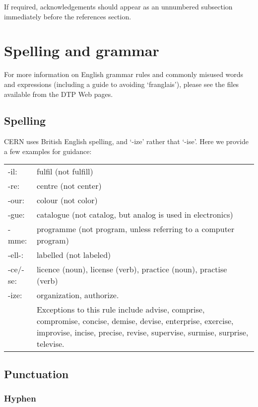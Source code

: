 \documentclass{cernyrep}
\begin{document}
If required, acknowledgements should appear as an unnumbered
subsection immediately before the references section.

\section{Spelling and grammar}

For more information on English grammar rules and commonly misused
words and expressions (including a guide to avoiding `franglais'),
please see the files available from the DTP Web pages.

\subsection{Spelling}

CERN uses British English spelling, and `-ize' rather that
`-ise'. Here we provide a few examples for guidance:
\begin{flushleft}
\begin{tabularx}{\linewidth}{@{}lX}
-il:     & fulfil (not fulfill) \\
-re:     & centre (not center) \\
-our:    & colour (not color) \\ 
-gue:    & catalogue (not catalog, but analog is used in electronics) \\ 
-mme:    & programme (not program, unless referring to a computer
           program) \\ 
-ell-:   & labelled (not labeled) \\ 
-ce/-se: & licence (noun), license (verb), practice (noun), practise (verb) \\ 
-ize:    & organization, authorize. \\
         & Exceptions to this rule include advise, comprise, compromise, 
           concise, demise, devise, enterprise, exercise, improvise, 
           incise, precise, revise, supervise, surmise, surprise, televise.\\
\end{tabularx}
\end{flushleft}

\subsection{Punctuation}

\subsubsection{Hyphen}
\end{document}
